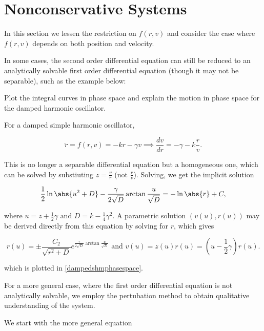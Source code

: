 \documentclass[english,a4paper,12pt]{report}
\begin{document}
\section{Nonconservative Systems}

In this section we lessen the restriction on \(f(r,v)\) and consider the case where \(f(r,v)\) depends on both position and velocity.  

In some cases, the second order differential equation can still be reduced to an analytically solvable first order differential equation (though it may not be separable), such as the example below:

{Plot the integral curves in phase space and explain the motion in phase space for the damped harmonic oscillator.}
{For a damped simple harmonic oscillator,

\begin{equation}
    \ddot{r} = f(r,v) = -kr- \gamma v \implies \frac{dv}{dr} = -\gamma - k \frac{r}{v}.  
\end{equation}

This is no longer a separable differential equation but a homogeneous one, which can be solved by substiuting \(z = \frac{v}{r} \) (not \(\frac{r}{v} \)). Solving, we get the implicit solution 

\begin{equation}
    \frac{1}{2}\ln \abs{u^2+D} - \frac{\gamma }{2\sqrt{D} }\arctan {\frac{u}{\sqrt{D} } } = -\ln \abs{r} + C,    
\end{equation}

where \(u = z + \frac{1}{2} \gamma \text { and } D = k - \frac{1}{4}\gamma ^2  \). A parametric solution \((v(u), r(u))\) may be derived directly from this equation by solving for \(r\), which gives

\begin{equation}
    r(u) = \pm \frac{C_2 }{\sqrt{r^2+D} } e^{\frac{\gamma }{2\sqrt{D} } \arctan {\frac{u}{\sqrt{D} } } } \text { and } v(u) = z(u)r(u) = (u - \frac{1}{2}\gamma  ) r(u).  
\end{equation}

which is plotted in \cref{dampedshmphasespace}. 
} 

For a more general case, where the first order differential equation is not analytically solvable, we employ the pertubation method to obtain qualitative understanding of the system. 

We start with the more general equation 
\end{document}
